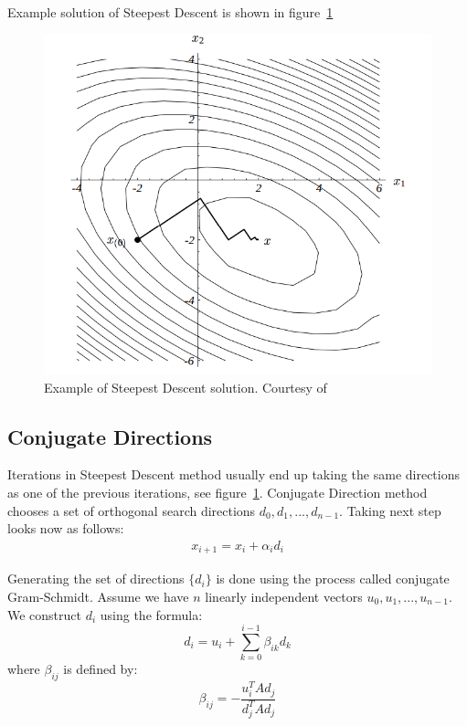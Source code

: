 \documentclass[en]{minipw} %
\begin{document}
Example solution of Steepest Descent is shown in figure~\ref{fig:steepest_descent}

\begin{figure}[h!]
\centering
\includegraphics[scale=0.5]{pictures/steepest_descent.png}
\caption[Steepest Descent steps]{Example of Steepest Descent solution. Courtesy of~\cite{cg}}
\label{fig:steepest_descent}
\end{figure}

\subsection{Conjugate Directions}
Iterations in Steepest Descent method usually end up taking the same directions as one of the previous iterations, see figure~\ref{fig:steepest_descent}. Conjugate Direction method chooses a set of orthogonal search directions $d_0, d_1,...,d_{n-1}$. Taking next step looks now as follows:
\begin{equation}
\begin{aligned}
x_{i+1} = x_{i} + \alpha_{i}d_{i}
\end{aligned}
\end{equation}

Generating the set of directions $\{ d_i \}$ is done using the process called conjugate Gram-Schmidt. Assume we have $n$ linearly independent vectors $u_0, u_1, ..., u_{n-1}$. We construct $d_i$ using the formula:
\begin{equation}
d_{i} = u_{i} + \sum^{i-1}_{k=0} \beta_{ik} d_{k}
\end{equation}
where $\beta_{ij}$ is defined by:
\begin{equation}
\beta_{ij} = - \dfrac{u^{T}_i A d_{j}}{d^{T}_{j}A d_{j}}
\end{equation}
\end{document}
